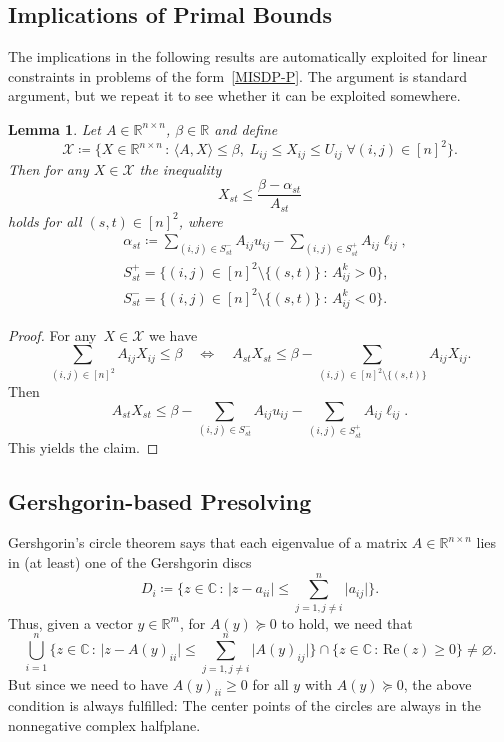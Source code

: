 \documentclass[10pt, a4paper]{article}
\renewcommand{\Re}{\text{Re}}
\newcommand{\suchthat}{\,:\,}
\newcommand{\abs}[1]{\lvert{#1}\rvert}
\newcommand{\define}{\coloneqq}
\newcommand{\skal}[2]{\langle{#1},{#2}\rangle}
\newcommand{\R}{\mathds{R}}
\newcommand{\C}{\mathds{C}}
\newtheorem{lemma}[theorem]{Lemma}
\begin{document}
\subsection{Implications of Primal Bounds}

The implications in the following results are automatically exploited for
linear constraints in problems of the form~\eqref{MISDP-P}. The argument
is standard argument, but we repeat it to see whether it can be exploited
somewhere.

\begin{lemma}
  Let $A \in \R^{n \times n}$, $\beta \in \R$ and define
  \[
    \mathcal{X} \define \{ X \in \R^{n\times n} \suchthat \skal{A}{X} \leq
    \beta,\; L_{ij} \leq X_{ij} \leq U_{ij}\; \forall (i,j) \in [n]^2\}.
  \]
  Then for any $X \in \mathcal{X}$ the inequality
  \[
    X_{st} \leq \frac{\beta - \alpha_{st}}{A_{st}}
  \]
  holds for all $(s,t) \in [n]^2$, where
  \begin{align*}
    & \alpha_{st} \define \sum_{(i,j) \in S^-_{st}} A_{ij} u_{ij} - \sum_{(i,j) \in S^+_{st}} A_{ij} \ell_{ij},\\
    & S^+_{st} = \{(i,j) \in [n]^2 \setminus \{(s,t)\} \suchthat A^k_{ij} > 0\},\\
    & S^-_{st} = \{(i,j) \in [n]^2 \setminus \{(s,t)\} \suchthat A^k_{ij} < 0\}.
  \end{align*}
\end{lemma}

\begin{proof}
  For any~$X \in \mathcal{X}$ we have
  \[
    \sum_{(i,j) \in [n]^2} A_{ij} X_{ij} \leq \beta
    \quad\Leftrightarrow\quad A_{st} X_{st} \leq \beta - \sum_{(i,j) \in [n]^2
      \setminus \{(s,t)\}} A_{ij} X_{ij}.
  \]
  Then
  \[
    A_{st} X_{st} \leq \beta - \sum_{(i,j) \in S^-_{st}} A_{ij} u_{ij} - \sum_{(i,j) \in S^+_{st}} A_{ij} \ell_{ij}.
  \]
  This yields the claim.
\end{proof}


\subsection{Gershgorin-based Presolving}

Gershgorin's circle theorem says that each eigenvalue of a matrix
$A \in \R^{n \times n}$ lies in (at least) one of the Gershgorin discs
\[
  D_i \define \Big\{z \in \C \suchthat \abs{z - a_{ii}} \leq \sum_{j=1, j \neq
    i}^n \abs{a_{ij}} \Big\}.
\]
Thus, given a vector $y \in \R^m$, for $A(y) \succeq 0$ to hold, we need
that
\[
  \bigcup_{i=1}^n \bigg\{z \in \C \suchthat \abs{z - A(y)_{ii}} \leq \sum_{j=1, j \neq
    i}^n \abs{A(y)_{ij}}\bigg\} \cap \{z \in \C \suchthat \Re(z) \geq 0\}
  \neq \varnothing.
\]
But since we need to have $A(y)_{ii} \geq 0$ for all $y$ with
$A(y) \succeq 0$, the above condition is always fulfilled: The center
points of the circles are always in the nonnegative complex halfplane.
\end{document}
